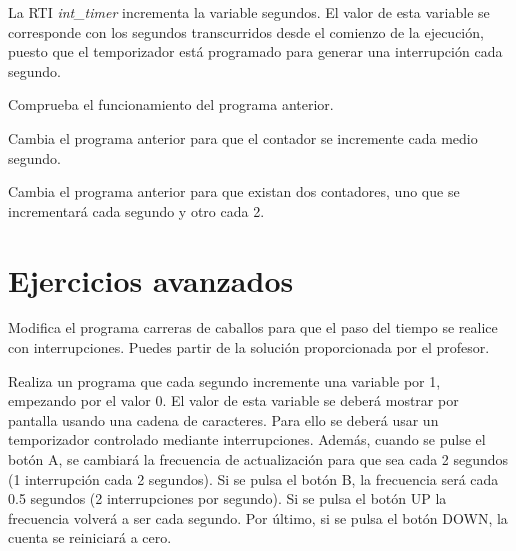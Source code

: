 	La RTI \textit{int\_timer} incrementa la variable segundos. El valor de esta variable se corresponde con los segundos transcurridos desde el comienzo de la ejecución, puesto que el temporizador está programado para generar una interrupción cada segundo. 

\begin{exercise}
Comprueba el funcionamiento del programa anterior.
\end{exercise}

\begin{exercise}
Cambia el programa anterior para que el contador se incremente cada medio segundo.
\end{exercise}

\begin{exercise}
Cambia el programa anterior para que existan dos contadores, uno que se incrementará cada segundo y otro cada 2.
\end{exercise}

\section{Ejercicios avanzados}
\begin{exercise}
	Modifica el programa carreras de caballos para que el paso del tiempo se realice con interrupciones. Puedes partir de la solución proporcionada por el profesor.
\end{exercise}

\begin{exercise}
Realiza un programa que cada segundo incremente una variable por 1, empezando por el valor 0. El valor de esta variable se deberá mostrar por pantalla usando una cadena de caracteres. Para ello se deberá usar un temporizador controlado mediante interrupciones. Además, cuando se pulse el botón A, se cambiará la frecuencia de actualización para que sea cada 2 segundos (1 interrupción cada 2 segundos). Si se pulsa el botón B, la frecuencia será cada 0.5 segundos (2 interrupciones por segundo). Si se pulsa el botón UP la frecuencia volverá a ser cada segundo. Por último, si se pulsa el botón DOWN, la cuenta se reiniciará a cero.
\end{exercise}


